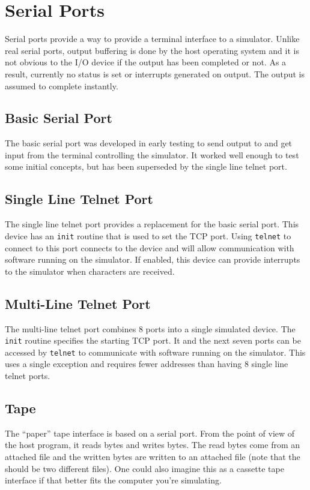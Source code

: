 \documentclass[10pt, openany]{book}
\begin{document}
\section{Serial Ports}
Serial ports provide a way to provide a terminal interface to a simulator.  Unlike real serial ports, output buffering is done by the host operating system and it is not obvious to the I/O device if the output has been completed or not.  As a result, currently no status is set or interrupts generated on output.  The output is assumed to complete instantly.

\subsection{Basic Serial Port}
The basic serial port was developed in early testing to send output to and get input from the terminal controlling the simulator.  It worked well enough to test some initial concepts, but has been superseded by the single line telnet port.

\subsection{Single Line Telnet Port}
The single line telnet port provides a replacement for the basic serial port.  This device has an \verb|init| routine that is used to set the TCP port.  Using \verb|telnet| to connect to this port connects to the device and will allow communication with software running on the simulator.  If enabled, this device can provide interrupts to the simulator when characters are received.

\subsection{Multi-Line Telnet Port}
The multi-line telnet port combines 8 ports into a single simulated device.  The \verb|init| routine specifies the starting TCP port.  It and the next seven ports can be accessed by \verb|telnet| to communicate with software running on the simulator.  This uses a single exception and requires fewer addresses than having 8 single line telnet ports.

\subsection{Tape}
The ``paper'' tape interface is based on a serial port.  From the point of view of the host program, it reads bytes and writes bytes.  The read bytes come from an attached file and the written bytes are written to an attached file (note that the should be two different files).  One could also imagine this as a cassette tape interface if that better fits the computer you're simulating.
\end{document}
